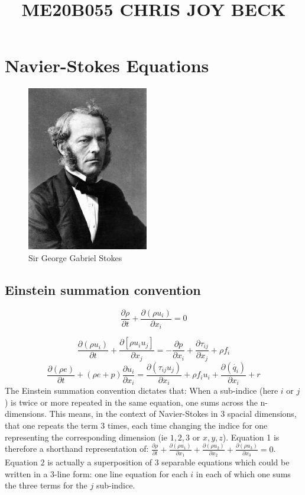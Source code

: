 \documentclass[12pt]{article}
\title{ME20B055 CHRIS JOY BECK}
\begin{document}
\maketitle					

\section{Navier-Stokes Equations}
\begin{figure}[h]
	\begin{center}
		\includegraphics[width=200px]{me20b055.eps}
	\end{center}
	\caption{Sir George Gabriel Stokes}
	\label{fig:revexp}
	\end{figure}

\subsection{Einstein summation convention}

\begin{equation}
\frac{\partial \rho}{\partial t} + \frac{\partial(\rho u_{i})}{\partial x_{i}} = 0
\end{equation}

\begin{equation}
\frac{\partial (\rho u_{i})}{\partial t} + \frac{\partial[\rho u_{i}u_{j}]}{\partial x_{j}} = -\frac{\partial p}{\partial x_{i}} + \frac{\partial \tau_{ij}}{\partial x_{j}} + \rho f_{i} \end{equation}
\begin{equation}
\frac{\partial (\rho e)}{\partial t} + (\rho e+p)\frac{\partial u_{i}}{\partial x_{i}} = \frac{\partial(\tau_{ij}u_{j})}{\partial x_{i}} + \rho f_{i}u_{i} + \frac{\partial(\dot{ q_{i}})}{\partial x_{i}} + r \end{equation}
The Einstein summation convention dictates that: When a sub-indice (here $i$ or $j$) is twice or more repeated in the same equation, one sums across the n-dimensions. 
This means, in the context of Navier-Stokes in 3 spacial dimensions, that one repeats the term 3 times, each time changing the indice for one representing the corresponding dimension (ie $1,2,3$ or $x,y,z$). Equation 1 is therefore a shorthand representation of: $\frac{\partial \rho}{\partial t}+\frac{\partial(\rho u_{1})}{\partial x_{1}}+\frac{\partial(\rho u_{2})}{\partial x_{2}}+ \frac{\partial(\rho u_{3})}{\partial x_{3}}=0$.
Equation $2$ is actually a superposition of 3 separable equations which could be written in a 3-line form: one line equation for each $i$ in each of which one sums the three terms for the $j$ sub-indice.
\end{document}
